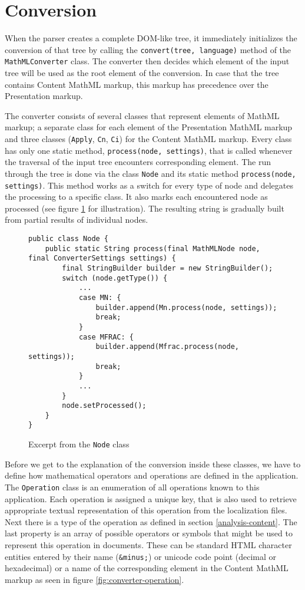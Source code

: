 \documentclass[11pt,oneside,final]{fithesis2}
\begin{document}
\section{Conversion}
When the parser creates a complete DOM-like tree, it immediately initializes the conversion of that tree by calling the \texttt{convert(tree, language)} method of the \texttt{MathMLConverter} class. The converter then decides which element of the input tree will be used as the root element of the conversion. In case that the tree contains Content MathML markup, this markup has precedence over the Presentation markup. 

The converter consists of several classes that represent elements of MathML markup; a separate class for each element of the Presentation MathML markup and three classes (\texttt{Apply}, \texttt{Cn}, \texttt{Ci}) for the Content MathML markup. Every class has only one static method, \texttt{process(node, settings)}, that is called whenever the traversal of the input tree encounters corresponding element. The run through the tree is done via the class \texttt{Node} and its static method \texttt{process(node, settings)}. This method works as a switch for every type of node and delegates the processing to a specific class. It also marks each encountered node as processed (see figure \ref{fig:converter-node} for illustration). The resulting string is gradually built from partial results of individual nodes.

\begin{figure}[!ht]
\begin{lstlisting}
public class Node {
	public static String process(final MathMLNode node, final ConverterSettings settings) {
		final StringBuilder builder = new StringBuilder();
        switch (node.getType()) {
            ...
            case MN: {
                builder.append(Mn.process(node, settings));
                break;
            }
            case MFRAC: {    
                builder.append(Mfrac.process(node, settings));
                break;
            }
            ...
        }
        node.setProcessed();
    }    
}
\end{lstlisting}
\caption{Excerpt from the \texttt{Node} class}
\label{fig:converter-node}
\end{figure}

Before we get to the explanation of the conversion inside these classes, we have to define how mathematical operators and operations are defined in the application. The \texttt{Operation} class is an enumeration of all operations known to this application. Each operation is assigned a unique key, that is also used to retrieve appropriate textual representation of this operation from the localization files. Next there is a type of the operation as defined in section \ref{analysis-content}. The last property is an array of possible operators or symbols that might be used to represent this operation in documents. These can be standard HTML character entities entered by their name (\texttt{\&minus;}) or unicode code point (decimal or hexadecimal) or a name of the corresponding element in the Content MathML markup as seen in figure \ref{fig:converter-operation}.
\end{document}
